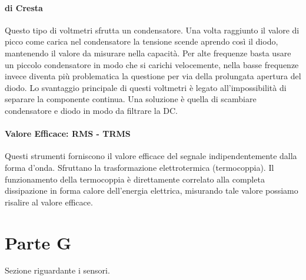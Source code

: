 \documentclass[12pt]{article}
\begin{document}
\paragraph{di Cresta} Questo tipo di voltmetri sfrutta un condensatore. Una volta raggiunto il valore di picco come carica nel condensatore la tensione scende aprendo così il diodo, mantenendo il valore da misurare nella capacità. Per alte frequenze basta usare un piccolo condensatore in modo che si carichi velocemente, nella basse frequenze invece diventa più problematica la questione per via della prolungata apertura del diodo. Lo svantaggio principale di questi voltmetri è legato all'impossibilità di separare la componente continua. Una soluzione è quella di scambiare condensatore e diodo in modo da filtrare la DC.

\paragraph{Valore Efficace: RMS - TRMS} Questi strumenti forniscono il valore efficace del segnale indipendentemente dalla forma d'onda. Sfruttano la trasformazione elettrotermica (termocoppia). Il funzionamento della termocoppia è direttamente correlato alla completa dissipazione in forma calore dell'energia elettrica, misurando tale valore possiamo risalire al valore efficace.

\section{Parte G}\label{G}
Sezione riguardante i sensori.
\end{document}
